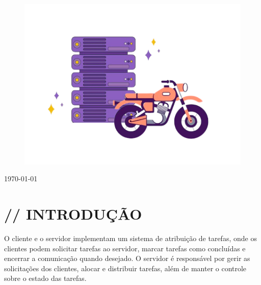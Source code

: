 \documentclass[12pt]{article}
\begin{document}
\begin{titlepage}
\begin{figure}[H]
    \centering
    \includegraphics[width=12cm]{ilustracaocapa}
\end{figure}
	
	\vfill\vfill\vfill %
	
	{\large\today} %
	
	
	 
	
	\vfill %
	
\end{titlepage}



\textsc{\tableofcontents}

\newpage


\section{// INTRODUÇÃO}
O cliente e o servidor implementam um sistema de atribuição de tarefas, onde os clientes podem solicitar tarefas ao servidor, marcar tarefas como concluídas e encerrar a comunicação quando desejado. O servidor é responsável por gerir as solicitações dos clientes, alocar e distribuir tarefas, além de manter o controle sobre o estado das tarefas.\\
\end{document}
